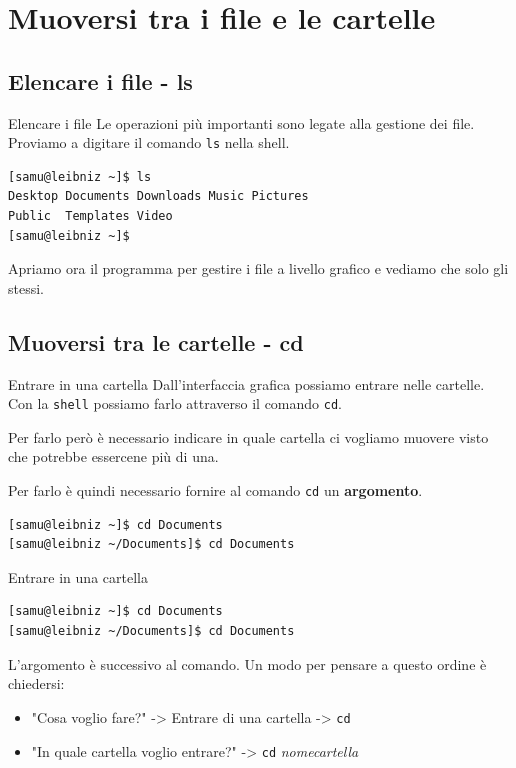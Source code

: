 \documentclass{beamer}
\begin{document}
\section{Muoversi tra i file e le cartelle}

\subsection{Elencare i file - ls}
\begin{frame}[fragile]{Elencare i file}
  Le operazioni più importanti sono legate alla gestione dei file. Proviamo a 
  digitare il comando \texttt{ls} nella shell.\bigskip

    \begin{lstlisting}
[samu@leibniz ~]$ ls
Desktop Documents Downloads Music Pictures 
Public  Templates Video
[samu@leibniz ~]$
    \end{lstlisting}

  Apriamo ora il programma per gestire i file a livello grafico e vediamo che
  solo gli stessi.
\end{frame}

\subsection{Muoversi tra le cartelle - cd}
\begin{frame}[fragile]{Entrare in una cartella}
  Dall'interfaccia grafica possiamo entrare nelle cartelle. Con la \texttt{shell}
  possiamo farlo attraverso il comando \texttt{cd}.\bigskip

  Per farlo però è necessario indicare in quale cartella ci vogliamo muovere 
  visto che potrebbe essercene più di una.\bigskip

  Per farlo è quindi necessario fornire al comando \texttt{cd} un 
  \textbf{argomento}.\bigskip

    \begin{lstlisting}
[samu@leibniz ~]$ cd Documents
[samu@leibniz ~/Documents]$ cd Documents
    \end{lstlisting}
\end{frame}

\begin{frame}[fragile]{Entrare in una cartella}
    \begin{lstlisting}
[samu@leibniz ~]$ cd Documents
[samu@leibniz ~/Documents]$ cd Documents
    \end{lstlisting}

  L'argomento è successivo al comando. Un modo per pensare a questo ordine è
  chiedersi:\medskip
  
  \begin{itemize}
    \item "Cosa voglio fare?" -> Entrare di una cartella -> \texttt{cd}
    \item "In quale cartella voglio entrare?" -> \texttt{cd} 
      \textit{nomecartella}
  \end{itemize}
\end{frame}
\end{document}
